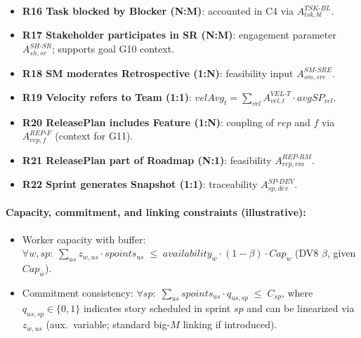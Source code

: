 \documentclass[11pt,a4paper]{article}
\begin{document}
\begin{itemize}[leftmargin=2em]
  \item \textbf{R16 Task blocked by Blocker (N:M)}: accounted in C4 via $A^{TSK\text{-}BL}_{tsk,bl}$.
  \item \textbf{R17 Stakeholder participates in SR (N:M)}: engagement parameter $A^{SH\text{-}SR}_{sh,sr}$; supports goal G10 context.
  \item \textbf{R18 SM moderates Retrospective (1:N)}: feasibility input $A^{SM\text{-}SRE}_{sm,sre}$.
  \item \textbf{R19 Velocity refers to Team (1:1)}: $velAvg_t = \sum_{vel} A^{VEL\text{-}T}_{vel,t}\cdot avgSP_{vel}$.
  \item \textbf{R20 ReleasePlan includes Feature (1:N)}: coupling of $rep$ and $f$ via $A^{REP\text{-}F}_{rep,f}$ (context for G11).
  \item \textbf{R21 ReleasePlan part of Roadmap (N:1)}: feasibility $A^{REP\text{-}RM}_{rep,rm}$.
  \item \textbf{R22 Sprint generates Snapshot (1:1)}: traceability $A^{SP\text{-}DEV}_{sp,dev}$.
\end{itemize}

\paragraph{Capacity, commitment, and linking constraints (illustrative):}
\begin{itemize}[leftmargin=2em]
  \item Worker capacity with buffer: $\forall w,sp:\; \sum_{us} z_{w,us}\cdot spoints_{us} \;\le\; availability_w \cdot (1-\beta)\cdot Cap_w$ (DV8 $\beta$, given $Cap_w$).
  \item Commitment consistency: $\forall sp:\; \sum_{us} spoints_{us}\cdot q_{us,sp} \;\le\; C_{sp}$, where $q_{us,sp}\in\{0,1\}$ indicates story scheduled in sprint $sp$ and can be linearized via $z_{w,us}$ (aux.\ variable; standard big-$M$ linking if introduced).
\end{itemize}

\end{document}
